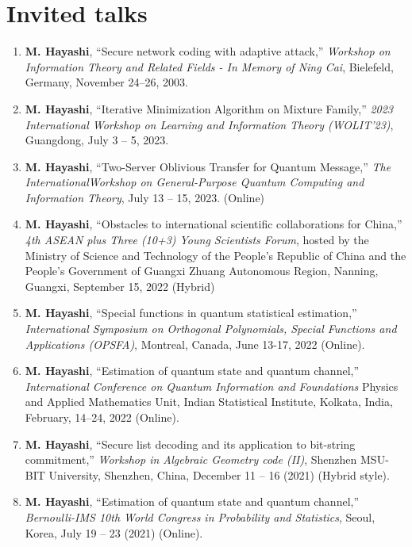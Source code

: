 \documentclass[a4paper,12pt,oneside]{article}
\begin{document}
\section{Invited talks}
\begin{enumerate}

\item 
\textbf{M. Hayashi}, 
``Secure network coding with adaptive attack,'' 
{\em Workshop on Information Theory and Related Fields - In Memory of Ning Cai}, 
Bielefeld, Germany, November 24–26, 2003.

\item 
\textbf{M. Hayashi}, 
``Iterative Minimization Algorithm on Mixture Family,'' 
{\em 2023 International Workshop on Learning and Information Theory (WOLIT’23)}, 
Guangdong, July 3 – 5, 2023.

\item 
\textbf{M. Hayashi}, 
``Two-Server Oblivious Transfer for Quantum Message,'' 
{\em The InternationalWorkshop on General-Purpose Quantum Computing and Information Theory}, 
July 13 – 15, 2023. (Online)

\item 
\textbf{M. Hayashi}, 
``Obstacles to international scientific collaborations for China,'' 
{\em  4th ASEAN plus Three (10+3) Young Scientists Forum}, 
hosted by the Ministry of Science and Technology of the People’s Republic of China and 
the People’s Government of Guangxi Zhuang Autonomous Region, 
Nanning, Guangxi, September 15, 2022 (Hybrid)

\item 
\textbf{M. Hayashi}, 
``Special functions in quantum statistical estimation,'' 
{\em  International Symposium on Orthogonal Polynomials, Special Functions and Applications (OPSFA)}, 
Montreal, Canada, June 13-17, 2022 (Online).

\item 
\textbf{M. Hayashi}, 
``Estimation of quantum state and quantum channel,'' 
{\em  International Conference on Quantum Information and Foundations} Physics and Applied Mathematics Unit, 
Indian Statistical Institute, Kolkata, India, February, 14–24, 2022 (Online).

\item 
\textbf{M. Hayashi}, 
``Secure list decoding and its application to bit-string commitment,'' 
{\em  Workshop in Algebraic Geometry code (II)}, 
Shenzhen MSU-BIT University, Shenzhen, China, December 11 – 16 (2021) (Hybrid style).

\item 
\textbf{M. Hayashi}, 
``Estimation of quantum state and quantum channel,'' 
{\em  Bernoulli-IMS 10th World Congress in Probability and Statistics}, 
Seoul, Korea, July 19 – 23 (2021) (Online).


\end{enumerate}
\end{document}
